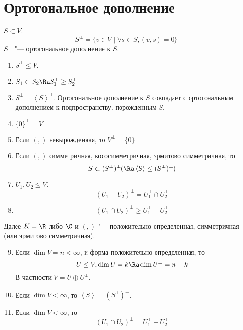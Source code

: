 ﻿\section{Ортогональное дополнение}

\begin{Def}
	$S \subset V$.
	\[ S^\bot = \{v \in V \mid \forall s \in S, (v, s) = 0\} \]
	$S^\bot$ "--- ортогональное дополнение к $S$.
\end{Def}

\begin{conseq}
	\begin{enumerate}
	\item
		$S^\bot \le V$.

	\item
		$S_1 \subset S_2 \Ra S_1^\bot \ge S_2^\bot$

	\item
		$S^\bot = \left<S\right>^\bot$.
		Ортогональное дополнение к $S$ совпадает
		с ортогональным дополнением к подпространству, порожденным $S$.

	\item
		$\{0\}^\bot = V$

	\item
		Если $(,)$ невырожденная, то $V^\bot = \{0\}$

	\item
		Если $(,)$ симметричная, кососимметричная, эрмитово симметричная, то
		\[ S \subset (S^\bot)^\bot (\Ra \left<S\right> \le (S^\bot)^\bot) \]

	\item
		$U_1, U_2 \le V$.
		\[ (U_1 + U_2)^\bot = U_1^\bot \cap U_2^\bot \]

	\item
		\[ (U_1 \cap U_2)^\bot \ge U_1^\bot + U_2^\bot \]
	\end{enumerate}
	\begin{Rem}
		Далее $K = \R$ либо $\C$ и $(,)$ "--- положительно определенная, симметричная (или эрмитово симметричная).
	\end{Rem}
	\begin{enumerate}
	\setcounter{enumi}{8}
	\item
		Если $\dim V = n < \infty$, и форма положительно определенная, то
		\[ U \le V, \dim U = k \Ra \dim U^\bot = n - k \]
		В частности $V = U \oplus U^\bot$.

	\item
		Если $\dim V < \infty$, то $\left<S\right> = (S^\bot)^\bot$.

	\item
		Если $\dim V < \infty$, то
		\[ (U_1 \cap U_2)^\bot = U_1^\bot + U_2^\bot \]
	\end{enumerate}
\end{conseq}
